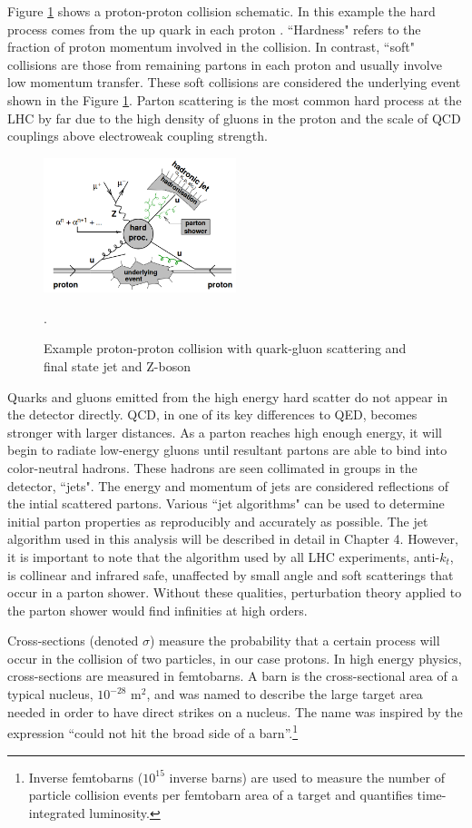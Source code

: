 Figure \ref{fig:protonproton} shows a proton-proton collision schematic. In this example the hard process comes from the up quark in each proton \cite{Butterworth}. ``Hardness" refers to the fraction of proton momentum involved in the collision. In contrast, ``soft" collisions are those from remaining partons in each proton and usually involve low momentum transfer. These soft collisions are considered the underlying event shown in the Figure \ref{fig:protonproton}. Parton scattering is the most common hard process at the LHC by far due to the high density of gluons in the proton and the scale of QCD couplings above electroweak coupling strength. 
\begin{figure}[H]
        \centering
    \includegraphics[width=0.5\textwidth] {Pictures/protonproton.png}\hspace{1cm}
    \caption{Example proton-proton collision with quark-gluon scattering and final state jet and Z-boson \cite{Butterworth}}.
    \label{fig:protonproton}
\end{figure}
Quarks and gluons emitted from the high energy hard scatter do not appear in the detector directly. QCD, in one of its key differences to QED, becomes stronger with larger distances. As a parton reaches high enough energy, it will begin to radiate low-energy gluons until resultant partons are able to bind into color-neutral hadrons. These hadrons are seen collimated in groups in the detector, ``jets". The energy and momentum of jets are considered reflections of the intial scattered partons. Various ``jet algorithms" can be used to determine initial parton properties as reproducibly and accurately as possible. The jet algorithm used in this analysis will be described in detail in Chapter 4. However, it is important to note that the algorithm used by all LHC experiments, anti-$k_t$, is collinear and infrared safe, unaffected by small angle and soft scatterings that occur in a parton shower. Without these qualities, perturbation theory applied to the parton shower would find infinities at high orders.

Cross-sections (denoted $\sigma$) measure the probability that a certain process will occur in the collision of two particles, in our case protons. In high energy physics, cross-sections are measured in femtobarns. A barn is the cross-sectional area of a typical nucleus, $10^{-28}$ m$^2$, and was named to describe the large target area needed in order to have direct strikes on a nucleus. The name was inspired by the expression ``could not hit the broad side of a barn''.\footnote{Inverse femtobarns ($10^{15}$ inverse barns) are used to measure the number of particle collision events per femtobarn area of a target and quantifies time-integrated luminosity.} 

